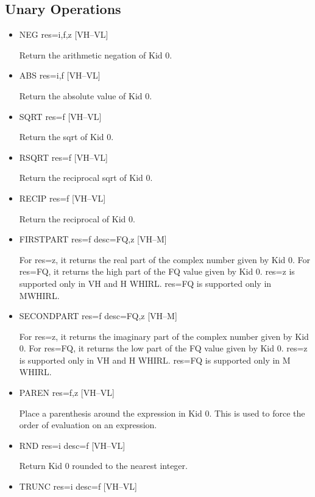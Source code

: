 \documentclass{article}
\begin{document}
\subsection{Unary Operations}
\begin{itemize}

\item  NEG res=i,f,z \hfill [VH--VL]

Return the arithmetic negation of Kid 0.

\item  ABS res=i,f \hfill [VH--VL]

Return the absolute value of Kid 0.

\item  SQRT res=f \hfill [VH--VL]

Return the sqrt of Kid 0.

\item  RSQRT res=f \hfill [VH--VL]

Return the reciprocal sqrt of Kid 0.

\item  RECIP res=f \hfill [VH--VL]

Return the reciprocal of Kid 0.

\item  FIRSTPART res=f desc=FQ,z \hfill [VH--M]

For res=z, it returns the real part of the complex number given by
Kid 0. For res=FQ, it returns the high part of the FQ value given
by Kid 0. res=z
is supported only in VH and H WHIRL. res=FQ is supported only in
MWHIRL.

\item  SECONDPART res=f desc=FQ,z \hfill [VH--M]

For res=z, it returns the imaginary part of the complex number
given by Kid 0. For res=FQ, it returns the low part of the FQ value
given by Kid 0.  res=z is supported only in VH and H WHIRL. res=FQ is supported
only in M WHIRL.

\item  PAREN res=f,z \hfill [VH--VL]

Place a parenthesis around the expression in Kid 0. This is used
to force the order of evaluation on an expression.

\item  RND res=i desc=f \hfill [VH--VL]

Return Kid 0 rounded to the nearest integer.

\item  TRUNC res=i desc=f \hfill [VH--VL]


\end{itemize}
\end{document}
